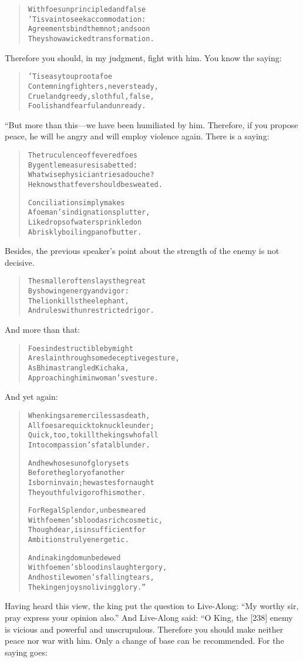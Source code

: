 \documentclass[article, twoside, 14pt]{memoir}
\renewenvironment{verbatim}{%
\begin{quote}%
\vskip -10pt%
\begin{alltt}\normalfont\large}{\end{alltt}%
\end{quote}%
\vskip -10pt
} %
\begin{document}
\begin{verbatim}
With foes unprincipled and false
    'Tis vain to seek accommodation:
Agreements bind them not; and soon
    They show a wicked transformation.
\end{verbatim}
Therefore you should, in my judgment, fight with him. You know the
saying:

\begin{verbatim}
'Tis easy to uproot a foe
    Contemning fighters, never steady,
Cruel and greedy, slothful, false,
    Foolish and fearful and unready.
\end{verbatim}
“But more than this---we have been humiliated by him. Therefore, if
you propose peace, he will be angry and will employ violence again.
There is a saying:

\begin{verbatim}
The truculence of fevered foes
    By gentle measures is abetted:
What wise physician tries a douche?
    He knows that fever should be sweated.

Conciliation simply makes
    A foeman's indignation splutter,
Like drops of water sprinkled on
    A briskly boiling pan of butter.
\end{verbatim}
Besides, the previous speaker's point about the strength of the
enemy is not decisive.

\begin{verbatim}
The smaller often slays the great
    By showing energy and vigor:
The lion kills the elephant,
    And rules with unrestricted rigor.
\end{verbatim}
And more than that:

\begin{verbatim}
Foes indestructible by might
    Are slain through some deceptive gesture,
As Bhima strangled Kichaka,
    Approaching him in woman's vesture.
\end{verbatim}
And yet again:

\begin{verbatim}
When kings are merciless as death,
    All foes are quick to knuckle under;
Quick, too, to kill the kings who fall
    Into compassion's fatal blunder.

And he whose sun of glory sets
    Before the glory of another
Is born in vain; he wastes for naught
    The youthful vigor of his mother.

For Regal Splendor, unbesmeared
    With foemen's blood as rich cosmetic,
Though dear, is insufficient for
    Ambitions truly energetic.

And in a kingdom unbedewed
    With foemen's blood in slaughter gory,
And hostile women's falling tears,
    The king enjoys no living glory.”
\end{verbatim}
Having heard this view, the king put the question to Live-Along:
``My worthy sir, pray express your opinion also.'' And Live-Along
said: “O King, the [238] enemy is vicious and powerful and
unscrupulous. Therefore you should make neither peace nor war with
him. Only a change of base can be recommended. For the saying
goes:
\end{document}
